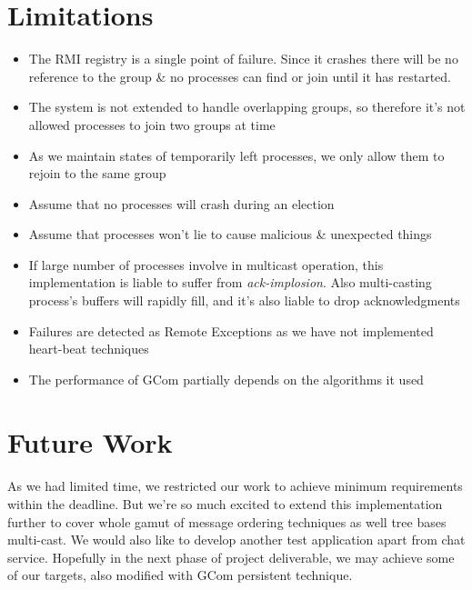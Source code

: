 \documentclass[a4paper,english,twoside]{article}
\begin{document}
\section{Limitations}
\begin{itemize}
\item The RMI registry is a single point of failure. Since it crashes there will be no reference to the group \& no processes can find or join until it has restarted.
\item The system is not extended to handle overlapping groups, so therefore it's not allowed processes to join two groups at time
\item As we maintain states of temporarily left processes, we only allow them to rejoin to the same group
\item Assume that no processes will crash during an election
\item Assume that processes won't lie to cause malicious \& unexpected things
\item If large number of processes involve in multicast operation, this implementation is liable to suffer from \emph{ack-implosion}. Also multi-casting process's buffers will rapidly fill, and it's also liable to drop acknowledgments
\item Failures are detected as Remote Exceptions as we have not implemented heart-beat techniques 
\item The performance of GCom partially depends on the algorithms it used
\end{itemize}
\section{Future Work}

\paragraph{}

As we had limited time, we restricted our work to achieve minimum requirements within the deadline. But we're so much excited to extend this implementation further to cover whole gamut of message ordering techniques as well tree bases multi-cast. We would also like to develop another test application apart from chat service. Hopefully in the next phase of project deliverable, we may achieve some of our targets, also modified with GCom persistent technique.

\appendix
\end{document}
